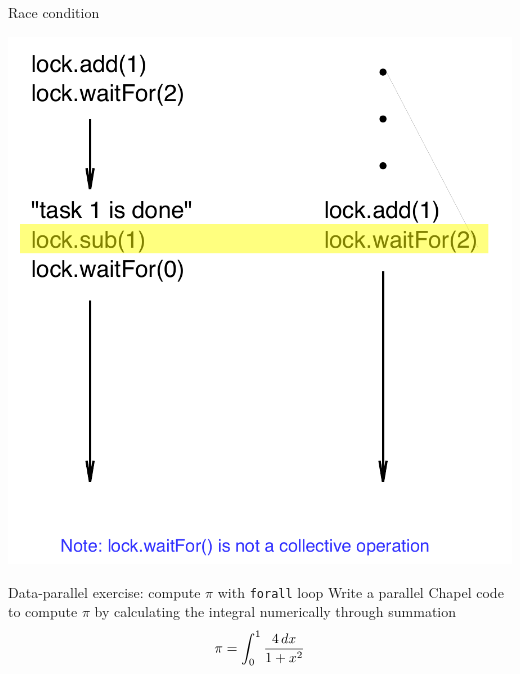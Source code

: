 \documentclass[10pt,xcolor=pdftex,dvipsnames,table]{beamer}
\begin{document}
\begin{frame}{Race condition}
  \begin{center}
    \includegraphics[width=0.65\columnwidth]{raceCondition.pdf}
  \end{center}
\end{frame}

\begin{frame}{Data-parallel exercise: compute $\pi$ with \texttt{forall} loop}
  Write a parallel Chapel code to compute $\pi$ by calculating the integral numerically through summation
  {\Large
    \[
    \pi=\int_0^1{4\,dx\over 1+x^2}
    \]}
\end{frame}
\end{document}

